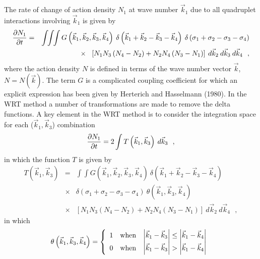 \documentclass[12pt]{book}
\begin{document}
The rate of change of action density $N_1 $ at
wave number $\vec{k}_1$ due to all quadruplet interactions involving
$\vec{k}_1$ is given by
\begin{eqnarray}
\frac{{\partial N_1 }}{{\partial t}} & = & \int\!\!\int\!\!\int G\left( \vec{k}_1
,\vec{k}_2 ,\vec{k}_3 ,\vec{k}_4 \right ) \: \delta \left( \vec{k}_1  + \vec{k}_2  - \vec{k}_3
- \vec{k}_4 \right)
\: \delta \left( {\sigma _1  + \sigma _2  - \sigma _3  - \sigma _4 }
\right) \nonumber \\  & &
\hspace{7mm}\times \:\:\: \left[ {N_1 N_3 \left( {N_4  - N_2 } \right)
+ N_2 N_4 \left(
{N_3  - N_1 } \right)} \right] \: d\vec{k}_2 \: d\vec{k}_3 \: d\vec{k}_4 \:\:\: ,
\end{eqnarray}
where the action density $N$ is defined in terms of the wave number
vector $\vec{k}$, $N = N(\vec{k})$. The term $G$ is a complicated coupling
coefficient for which an explicit expression has been given by Herterich and Hasselmann (1980).
In the WRT method a number of transformations are
made to remove the delta functions. A key element in the WRT method
is to consider the integration space for each ($\vec{k}_1 ,\vec{k}_3$)
combination
\begin{equation}
{{\partial N_1 } \over {\partial t}} = 2\int T\left( {\vec{k}_1 ,\vec{k}_3 }
\right) \: d\vec{k}_3  \:\:\: ,
\end{equation}
in which the function $T$ is given by
\begin{eqnarray}
T \left( \vec{k}_1 ,\vec{k}_3 \right) & = & \int\!\!\int
G\left( \vec{k}_1 ,\vec{k}_2, \vec{k}_3 ,\vec{k}_4 \right) \: \delta \left( \vec{k}_1  +
\vec{k}_2  - \vec{k}_3  - \vec{k}_4 \right) \nonumber \\
& \times & \delta \left( {\sigma _1  + \sigma _2  - \sigma _3  -
\sigma _4 }
\right) \: \theta \left ( \vec{k}_1 , \vec{k}_3 , \vec{k}_4 \right )
\nonumber \\
& \times & \left [ N_1 N_3 \left ( N_4 - N_2 \right ) + N_2 N_4 \left
(
N_3  - N_1 \right ) \right ] \: d\vec{k}_2 \: d\vec{k}_4 \:\:\: ,
\label{eq:WRT_T}
\end{eqnarray}
in which
\begin{equation}
\theta \left( {\vec{k}_1 ,\vec{k}_3 ,\vec{k}_4 } \right) = \left\{ {\begin{array}{*{20}c}
   1 & {\rm{when}} & {\left| {\vec{k}_1  - \vec{k}_3 } \right| \leq \left| {\vec{k}_1  - \vec{k}_4 } \right|}  \\
   0 & {\rm{when}} & {\left| {\vec{k}_1  - \vec{k}_3 } \right| > \left| {\vec{k}_1  - \vec{k}_4 } \right|}  \\
 \end{array} } \right.
\end{equation}
\end{document}
